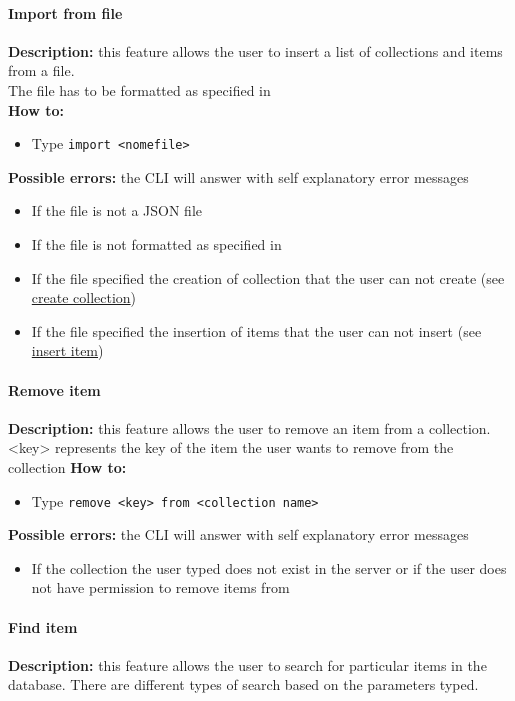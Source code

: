 \documentclass{scalatekids-article}
\begin{document}
\paragraph{Import from file}
\label{sec:import}
\textbf{Description:} this feature allows the user to insert a list of collections and items from a file.\\
The file has to be formatted as specified in \\%
\textbf{How to:} 
\begin{itemize}
	\item Type \texttt{import <nomefile>}
\end{itemize}
\textbf{Possible errors:} the CLI will answer with self explanatory error messages 
\begin{itemize}
	\item If the file is not a JSON file
	\item If the file is not formatted as specified in %
	\item If the file specified the creation of collection that the user can not create (see \hyperref[sec:createcollection]{create collection})
	\item If the file specified the insertion of items that the user can not insert (see \hyperref[sec:insertitem]{insert item}) 
\end{itemize}

\paragraph{Remove item}
\label{sec:removeitem}
\textbf{Description:} this feature allows the user to remove an item from a collection.\\
<key> represents the key of the item the user wants to remove from the collection
\textbf{How to:} 
\begin{itemize}
	\item Type \texttt{remove <key> from <collection name>}
\end{itemize}
\textbf{Possible errors:} the CLI will answer with self explanatory error messages 
\begin{itemize}
	\item If the collection the user typed does not exist in the server or if the user does not have permission to remove items from
\end{itemize}

\paragraph{Find item}
\label{sec:find}
\textbf{Description:} this feature allows the user to search for particular items in the database. There are different types of search based on the parameters typed.\\
\end{document}
